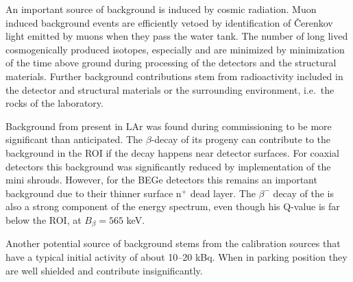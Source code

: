  An important source of background is induced by cosmic radiation. Muon induced background events are efficiently vetoed by identification of Čerenkov light emitted by muons when they pass the water tank. The number of long lived cosmogenically produced isotopes, especially  and  are minimized by minimization of the time above ground during processing of the detectors and the structural materials. Further background contributions stem from radioactivity included in the detector and structural materials or the surrounding environment, i.e.~the rocks of the laboratory.

Background from  present in LAr was found during {\gerda} commissioning to be more significant than anticipated. The $\beta$-decay of its progeny  can contribute to the background in the ROI if the decay happens near detector surfaces. For coaxial detectors this background was significantly reduced by implementation of the mini shrouds. However, for the BEGe detectors this remains an important background due to their thinner surface n$^+$ dead layer. The $\beta^-$ decay of the  is also a strong component of the energy spectrum, even though his Q-value is far below the ROI, at $B_\beta=565$ keV.

Another potential source of background stems from the calibration sources that have a typical initial activity of about 10–20 kBq. When in parking position they are well shielded and contribute insignificantly.

